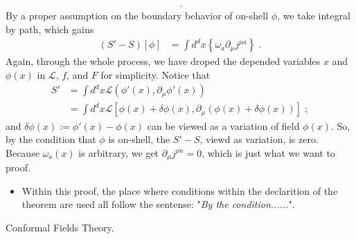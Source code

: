 \documentclass[]{article}
\begin{document}
\begin{roof}
\begin{align}
    \;.
  \end{align}
  By a proper assumption on the boundary behavior of on-shell $\phi$, we take integral by path, which gains
   \begin{align}
    (S' - S) [\phi]
    & =
    \int d^d x \left\{
      \omega_a \partial_{\mu} j^{\mu a}
      \right\}
    \;.
  \end{align}
  Again, through the whole process, we have droped the depended variables $x$ and $\phi(x)$ in $\mathscr{L}$, $f$, and $F$ for simplicity. 
  Notice that
  \begin{align}
    S'
    & =
    \int d^d x \mathscr{L} \left(\phi' (x), \partial_{\mu} \phi'(x) \right)
    \\
    & =
    \int d^d x \mathscr{L} \left[\phi (x) + \delta \phi (x), \partial_{\mu} \left( \phi(x) + \delta \phi(x) \right) \right]
    \;;
  \end{align}
  and $\delta \phi(x) := \phi'(x) - \phi(x)$ can be viewed as a variation of field $\phi(x)$. So, by the condition that $\phi$ is on-shell, the $S' - S$, viewd as variation, is zero. Because $\omega_a(x)$ is arbitrary, we get
  $\partial_{\mu} j^{\mu a} = 0$,
  which is just what we want to proof.
\end{roof}

\begin{itemize}
\item
  Within this proof, the place where conditions within the declarition of the theorem are used all follow the sentense: "{\it By the condition......}".
\end{itemize}





\begin{thebibliography}{9}

  \label{gyb}
  Conformal Fields Theory.

\end{thebibliography}
\end{document}
